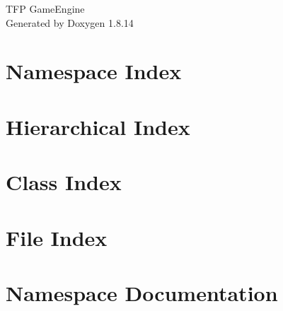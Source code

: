 \documentclass[twoside]{book}
\newcommand{\+}{\discretionary{\mbox{\scriptsize$\hookleftarrow$}}{}{}}
\newcommand{\clearemptydoublepage}{%
  \newpage{\pagestyle{empty}\cleardoublepage}%
}
\begin{document}
\hypersetup{pageanchor=false,
             bookmarksnumbered=true,
             pdfencoding=unicode
            }
\begin{titlepage}
\vspace*{7cm}
\begin{center}%
{\Large T\+FP Game\+Engine }\\
\vspace*{1cm}
{\large Generated by Doxygen 1.8.14}\\
\end{center}
\end{titlepage}
\clearemptydoublepage
{}
\tableofcontents
\clearemptydoublepage
{}
\hypersetup{pageanchor=true}

\chapter{Namespace Index}

\chapter{Hierarchical Index}

\chapter{Class Index}

\chapter{File Index}

\chapter{Namespace Documentation}

\end{document}
